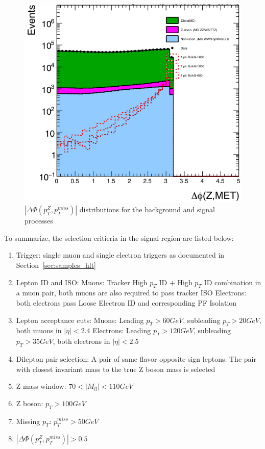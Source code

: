 \begin{figure}[htbp]
\begin{center}
\includegraphics[width=0.9\linewidth]{figures/sel_deltaPhi_ZMET.png}
\caption{$|\Delta \Phi (p_T ^Z ,p_T ^{miss})|$ distributions for the background and signal processes}
\label{fig:fig:sel_deltphi}
\end{center}
\end{figure}


\vspace{0.3cm}
To summarize, the selection critieria in the signal region are listed below:
\begin{enumerate}
\item Trigger: single muon and single electron triggers as documented in Section~\ref{sec:samples_hlt}
\item Lepton ID and ISO:
  \subitem Muons: Tracker High $p_T$ ID $+$ High $p_T$ ID combination in a muon pair, 
  both muons are also required to pass tracker ISO
  \subitem Electrons: both electrons pass Loose Electron ID and corresponding PF Isolation
\item Lepton acceptance cuts:
  \subitem Muons: Leading  $p_T > 60 GeV$, subleading $p_T > 20 GeV$, both muons in $|\eta| < 2.4$
  \subitem Electrons: Leading $p_T >120 GeV$, subleading $p_T >35 GeV$, both electrons in $|\eta|<2.5$
\item Dilepton pair selection: A pair of same flavor opposite sign
  leptons. The pair with closest invariant mass to the true Z boson mass is selected
\item Z mass window:   $70 < |M_{ll}| < 110 GeV$
\item Z boson: $p_T >100 GeV$
\item Missing $p_T$: $p_T ^{miss} > 50GeV$
\item $|\Delta \Phi (p_T ^Z ,p_T ^{miss})|>0.5$
\end{enumerate}

